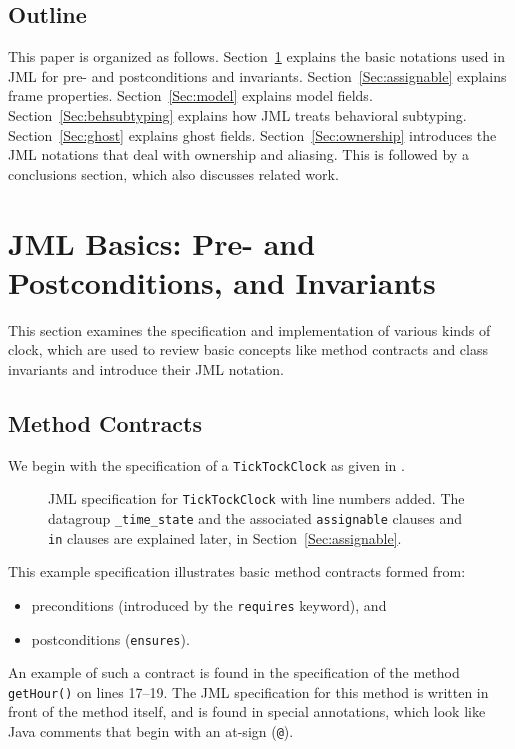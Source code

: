 \documentclass{llncs}
\begin{document}
\subsection{Outline}

This paper is organized as follows.  Section~\ref{Sec:basics}
explains the basic notations used in JML for pre- and postconditions
and invariants. Section~\ref{Sec:assignable} explains frame properties.
Section~\ref{Sec:model} explains model fields.
Section~\ref{Sec:behsubtyping} explains how JML treats behavioral subtyping.
Section~\ref{Sec:ghost} explains ghost fields.
Section~\ref{Sec:ownership} introduces the JML notations that deal with
ownership and aliasing.  This is followed by a conclusions section,
which also discusses related work.

\section{JML Basics: Pre- and Postconditions, and Invariants}
\label{Sec:basics}


%
%
This section examines the specification and implementation of
various kinds of clock, which are used to review basic concepts like
method contracts and class invariants and introduce their JML notation.

\subsection{Method Contracts}

%
We begin with the specification of a \texttt{TickTockClock} as given in
.
\begin{figure}[tbp]
%
%
\vspace*{-2ex} %
\caption{JML specification for \texttt{TickTockClock} with line
  numbers added. The datagroup \texttt{\_time\_state} and the
  associated \texttt{assignable} clauses and \texttt{in} clauses are
  explained later, in Section~\ref{Sec:assignable}.} 
\label{Example:TickTockClock}
\end{figure}
This example specification illustrates basic
method contracts formed from:
%
\begin{itemize}
  \item preconditions (introduced by the \texttt{requires} keyword), and
  \item postconditions (\texttt{ensures}).
\end{itemize}
An example of such a contract is found in the specification of the
method \texttt{getHour()} on lines 17--19.  The JML specification for
this method is written in front of the method itself, and is found in
special annotations, which look like Java comments that begin with an
at-sign (\texttt{@}).
\end{document}

